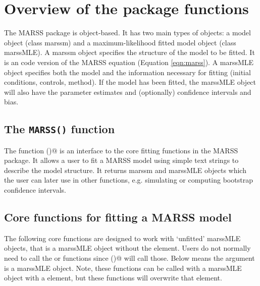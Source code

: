 \chapter{Overview of the package functions}
\label{chap:mainfunctions}
The MARSS package is object-based.  It has two main types of objects: a model object (class marssm) and a maximum-likelihood fitted model object (class marssMLE). A marssm object specifies the structure of the model to be fitted.  It is an \R code version of the MARSS equation (Equation \ref{eqn:marss}).  A marssMLE object specifies both the model and the information necessary for fitting (initial conditions, controls, method).  If the model has been fitted, the marssMLE object will also have the parameter estimates and (optionally) confidence intervals and bias.  

\section{The \texttt{MARSS()} function}
The function \verb@MARSS()@ is an interface to the core fitting functions in the MARSS package.  It allows a user to fit a MARSS model using simple text strings to describe the model structure.  It returns marssm and marssMLE objects which the user can later use in other functions, e.g. simulating or computing bootstrap confidence intervals.

\section{Core functions for fitting a MARSS model}
The following core functions are designed to work with `unfitted' marssMLE objects, that is a marssMLE object without the \verb@par@ element.  Users do not normally need to call the \verb@MARSSkem@ or \verb@MARSSoptim@ functions since \verb@MARSS()@ will call those. Below \verb@MLEobj@ means the argument is a marssMLE object.  Note, these functions can be called with a marssMLE object with a \verb@par@ element, but these functions will overwrite that element.

